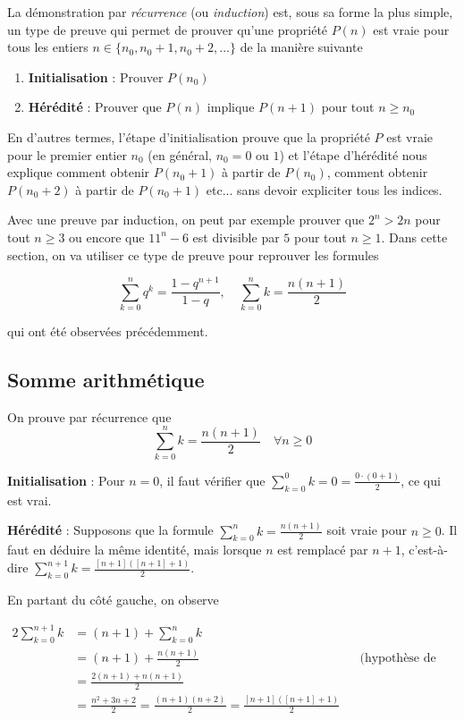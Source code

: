 \documentclass[oneside,11pt,french,table]{book}
\theoremstyle{definition}
\theoremstyle{plain}
\theoremstyle{remark}
\begin{document}
La démonstration par \textit{récurrence} (ou \textit{induction}) est, sous sa forme la plus simple, un type de preuve qui permet de prouver qu'une propriété $P(n)$ est vraie pour tous les entiers $n \in \{n_0, n_0 + 1, n_0 + 2, ...\}$ de la manière suivante

\begin{enumerate}
    \item \textbf{Initialisation} : Prouver $P(n_0)$
    \item \textbf{Hérédité} : Prouver que $P(n)$ implique $P(n+1)$ pour tout $n \geq n_0$
\end{enumerate}

En d'autres termes, l'étape d'initialisation prouve que la propriété $P$ est vraie pour le premier entier $n_0$ (en général, $n_0 = 0$ ou $1$) et l'étape d'hérédité nous explique comment obtenir $P(n_0 + 1)$ à partir de $P(n_0)$, comment obtenir $P(n_0 + 2)$ à partir de $P(n_0 + 1)$ etc... sans devoir expliciter tous les indices.

Avec une preuve par induction, on peut par exemple prouver que $2^n > 2n$ pour tout $n \geq 3$ ou encore que $11^n - 6$ est divisible par $5$ pour tout $n \geq 1$. Dans cette section, on va utiliser ce type de preuve pour reprouver les formules

$$\sum_{k=0}^n q^k = \frac{1-q^{n+1}}{1-q}, \quad \sum_{k=0}^n k = \frac{n(n+1)}{2}$$

qui ont été observées précédemment. 

\subsection{Somme arithmétique}
On prouve par récurrence que 
$$\sum_{k=0}^n k = \frac{n(n+1)}{2} \quad \forall n \geq 0$$

\textbf{Initialisation} : Pour $n = 0$, il faut vérifier que  $\sum_{k=0}^0 k = 0 = \frac{0 \cdot (0+1)}{2}$, ce qui est vrai.

\textbf{Hérédité} : Supposons que la formule $\sum_{k=0}^n k = \frac{n(n+1)}{2}$ soit vraie pour $n \geq 0$. Il faut en déduire la même identité, mais lorsque $n$ est remplacé par $n+1$, c'est-à-dire $\sum_{k=0}^{n+1} k = \frac{[n+1]([n+1]+1)}{2}$. 

En partant du côté gauche, on observe

\begin{alignat*}{2}
    \sum_{k=0}^{n+1} k &= (n+1) + \sum_{k=0}^{n} k && \\
    &= (n+1) + \frac{n(n+1)}{2} && \text{(hypothèse de récurrence)} \\
    &= \frac{2(n+1) + n(n+1)}{2} && \\
    &= \frac{n^2 + 3n + 2}{2} = \frac{(n+1)(n+2)}{2} =  \frac{[n+1]([n+1]+1)}{2}
\end{alignat*}
\end{document}
